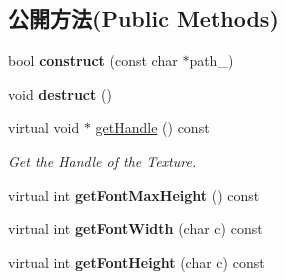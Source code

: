 \subsection*{公開方法(Public Methods)}
\begin{DoxyCompactItemize}
\item 
bool {\bfseries construct} (const char $\ast$path\+\_\+)\hypertarget{class_i_dream_sky_1_1_font_aa2a03876af821be9d3cb7fa6f5018aff}{}\label{class_i_dream_sky_1_1_font_aa2a03876af821be9d3cb7fa6f5018aff}

\item 
void {\bfseries destruct} ()\hypertarget{class_i_dream_sky_1_1_font_a617d7ce6f55319769b70bfae047762b5}{}\label{class_i_dream_sky_1_1_font_a617d7ce6f55319769b70bfae047762b5}

\item 
virtual void $\ast$ \hyperlink{class_i_dream_sky_1_1_font_ae39eee8daf71d9379bb7d7fccb502442}{get\+Handle} () const 
\begin{DoxyCompactList}\small\item\em Get the Handle of the Texture. \end{DoxyCompactList}\item 
virtual int {\bfseries get\+Font\+Max\+Height} () const \hypertarget{class_i_dream_sky_1_1_font_a87d0a3c75b86a504de5d07c24cdf068d}{}\label{class_i_dream_sky_1_1_font_a87d0a3c75b86a504de5d07c24cdf068d}

\item 
virtual int {\bfseries get\+Font\+Width} (char c) const \hypertarget{class_i_dream_sky_1_1_font_a13295e1ba54f3af7869639bbb81d6441}{}\label{class_i_dream_sky_1_1_font_a13295e1ba54f3af7869639bbb81d6441}

\item 
virtual int {\bfseries get\+Font\+Height} (char c) const \hypertarget{class_i_dream_sky_1_1_font_add65acda319db553876a61e7958571c0}{}\label{class_i_dream_sky_1_1_font_add65acda319db553876a61e7958571c0}


\end{DoxyCompactItemize}
